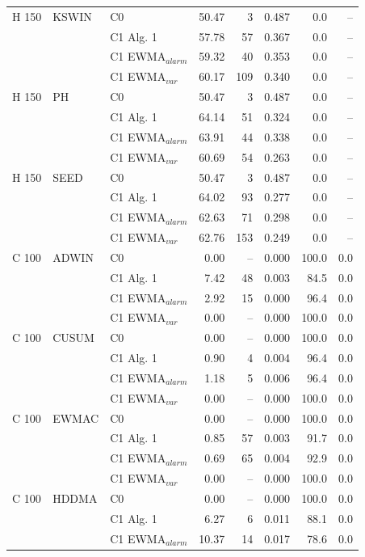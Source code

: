 \begin{longtable}{lllrrrrr}
\hline
H  150 & KSWIN & C0 & 50.47 & 3 & 0.487 & 0.0 & -- \\
 &  & C1 Alg. 1 & 57.78 & 57 & 0.367 & 0.0 & -- \\
 &  & C1 EWMA$_{alarm}$ & 59.32 & 40 & 0.353 & 0.0 & -- \\
 &  & C1 EWMA$_{var}$ & 60.17 & 109 & 0.340 & 0.0 & -- \\
\hline
H  150 & PH & C0 & 50.47 & 3 & 0.487 & 0.0 & -- \\
 &  & C1 Alg. 1 & 64.14 & 51 & 0.324 & 0.0 & -- \\
 &  & C1 EWMA$_{alarm}$ & 63.91 & 44 & 0.338 & 0.0 & -- \\
 &  & C1 EWMA$_{var}$ & 60.69 & 54 & 0.263 & 0.0 & -- \\
\hline
H  150 & SEED & C0 & 50.47 & 3 & 0.487 & 0.0 & -- \\
 &  & C1 Alg. 1 & 64.02 & 93 & 0.277 & 0.0 & -- \\
 &  & C1 EWMA$_{alarm}$ & 62.63 & 71 & 0.298 & 0.0 & -- \\
 &  & C1 EWMA$_{var}$ & 62.76 & 153 & 0.249 & 0.0 & -- \\
\hline
C  100 & ADWIN & C0 & 0.00 & -- & 0.000 & 100.0 & 0.0 \\
 &  & C1 Alg. 1 & 7.42 & 48 & 0.003 & 84.5 & 0.0 \\
 &  & C1 EWMA$_{alarm}$ & 2.92 & 15 & 0.000 & 96.4 & 0.0 \\
 &  & C1 EWMA$_{var}$ & 0.00 & -- & 0.000 & 100.0 & 0.0 \\
\hline
C  100 & CUSUM & C0 & 0.00 & -- & 0.000 & 100.0 & 0.0 \\
 &  & C1 Alg. 1 & 0.90 & 4 & 0.004 & 96.4 & 0.0 \\
 &  & C1 EWMA$_{alarm}$ & 1.18 & 5 & 0.006 & 96.4 & 0.0 \\
 &  & C1 EWMA$_{var}$ & 0.00 & -- & 0.000 & 100.0 & 0.0 \\
\hline
C  100 & EWMAC & C0 & 0.00 & -- & 0.000 & 100.0 & 0.0 \\
 &  & C1 Alg. 1 & 0.85 & 57 & 0.003 & 91.7 & 0.0 \\
 &  & C1 EWMA$_{alarm}$ & 0.69 & 65 & 0.004 & 92.9 & 0.0 \\
 &  & C1 EWMA$_{var}$ & 0.00 & -- & 0.000 & 100.0 & 0.0 \\
\hline
C  100 & HDDMA & C0 & 0.00 & -- & 0.000 & 100.0 & 0.0 \\
 &  & C1 Alg. 1 & 6.27 & 6 & 0.011 & 88.1 & 0.0 \\
 &  & C1 EWMA$_{alarm}$ & 10.37 & 14 & 0.017 & 78.6 & 0.0 \\

\end{longtable}
